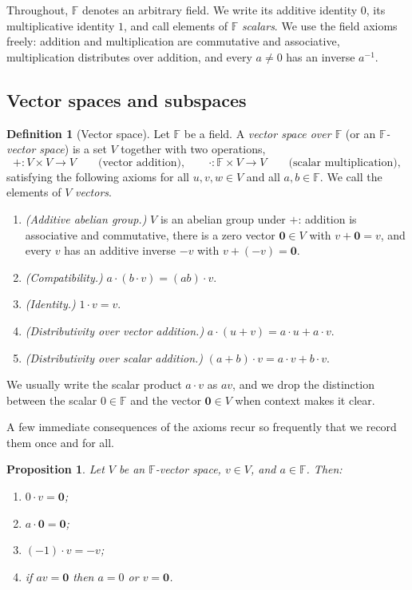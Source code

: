 \documentclass[11pt,a4paper]{article}
\newtheorem{proposition}[theorem]{Proposition}
\theoremstyle{definition}
\newtheorem{definition}[theorem]{Definition}
\theoremstyle{remark}
\newcommand{\F}{\ensuremath{\mathbb{F}}}
\begin{document}
Throughout, \(\F\) denotes an arbitrary field. We write its additive identity \(0\), its multiplicative identity \(1\), and call elements of \(\F\) \emph{scalars}. We use the field axioms freely: addition and multiplication are commutative and associative, multiplication distributes over addition, and every \(a \neq 0\) has an inverse \(a^{-1}\).

\subsection{Vector spaces and subspaces}\label{linalg:subsec-vs}

\begin{definition}[Vector space]\label{linalg:def-vs}
Let \(\F\) be a field. A \emph{vector space over \(\F\)} (or an \emph{\(\F\)-vector space}) is a set \(V\) together with two operations,
\[
+ \colon V \times V \to V \qquad\text{(vector addition)}, \qquad
\cdot \colon \F \times V \to V \qquad\text{(scalar multiplication)},
\]
satisfying the following axioms for all \(u, v, w \in V\) and all \(a, b \in \F\). We call the elements of \(V\) \emph{vectors}.
\begin{enumerate}
\item \emph{(Additive abelian group.)} \(V\) is an abelian group under \(+\): addition is associative and commutative, there is a zero vector \(\mathbf{0} \in V\) with \(v + \mathbf{0} = v\), and every \(v\) has an additive inverse \(-v\) with \(v + (-v) = \mathbf{0}\).
\item \emph{(Compatibility.)} \(a \cdot (b \cdot v) = (ab) \cdot v\).
\item \emph{(Identity.)} \(1 \cdot v = v\).
\item \emph{(Distributivity over vector addition.)} \(a \cdot (u + v) = a \cdot u + a \cdot v\).
\item \emph{(Distributivity over scalar addition.)} \((a + b) \cdot v = a \cdot v + b \cdot v\).
\end{enumerate}
We usually write the scalar product \(a \cdot v\) as \(av\), and we drop the distinction between the scalar \(0 \in \F\) and the vector \(\mathbf{0} \in V\) when context makes it clear.
\end{definition}

A few immediate consequences of the axioms recur so frequently that we record them once and for all.

\begin{proposition}\label{linalg:prop-vs-basic}
Let \(V\) be an \(\F\)-vector space, \(v \in V\), and \(a \in \F\). Then:
\begin{enumerate}
\item \(0 \cdot v = \mathbf{0}\);
\item \(a \cdot \mathbf{0} = \mathbf{0}\);
\item \((-1) \cdot v = -v\);
\item if \(a v = \mathbf{0}\) then \(a = 0\) or \(v = \mathbf{0}\).
\end{enumerate}
\end{proposition}
\end{document}
